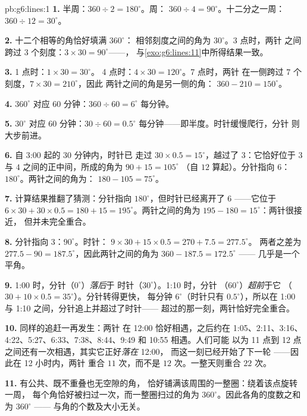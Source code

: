 \begin{solution}{pb:g6:lines:1}
\textbf{1.} 半周：$360 \div 2 = 180^\circ$。周：
$360 \div 4 = 90^\circ$。十二分之一周：$360 \div 12 = 30^\circ$。

\textbf{2.} 十二个相等的角恰好填满 $360^\circ$：
相邻刻度之间的角为 $30^\circ$。3 点时，两针
之间跨过 $3$ 个刻度：$3 \times 30 = 90^\circ$——，
与\cref{exo:g6:lines:11}中所得结果一致。

\textbf{3.} 1 点时：$1 \times 30 = 30^\circ$。
4 点时：$4 \times 30 = 120^\circ$。7 点时，两针
在一侧跨过 $7$ 个刻度，$7 \times 30 = 210^\circ$，因此
两针之间的角是另一侧的角：
$360 - 210 = 150^\circ$。

\textbf{4.} $360^\circ$ 对应 $60$ 分钟：$360 \div 60 =
6^\circ$ 每分钟。

\textbf{5.} $30^\circ$ 对应 $60$ 分钟：$30 \div 60 = 0.5^\circ$
每分钟——即半度。时针缓慢爬行，分针
则大步前进。

\textbf{6.} 自 3:00 起的 $30$ 分钟内，时针已
走过 $30 \times 0.5 = 15^\circ$，越过了 $3$：它恰好位于
$3$ 与 $4$ 之间的正中间，所成的角为 $90 + 15 = 105^\circ$
（自 $12$ 算起）。分针指向 $6$：
$180^\circ$。两针之间的角为：
$180 - 105 = 75^\circ$。

\textbf{7.} 计算结果推翻了猜测：分针指向
$180^\circ$，但时针已经离开了 $6$ ——它位于
$6 \times 30 + 30 \times 0.5 = 180 + 15 = 195^\circ$。两针之间的角为
$195 - 180 = 15^\circ$：两针很接近，
但并未完全重合。

\textbf{8.} 分针指向 $3$：$90^\circ$。时针：
$9 \times 30 + 15 \times 0.5 = 270 + 7.5 = 277.5^\circ$。
两者之差为 $277.5 - 90 = 187.5^\circ$，因此两针之间的角为
$360 - 187.5 = 172.5^\circ$ ——
几乎是一个平角。

\textbf{9.} 1:00 时，分针（$0^\circ$）\emph{落后}于
时针（$30^\circ$）。1:10 时，分针
（$60^\circ$）\emph{超前}于它
（$30 + 10 \times 0.5 = 35^\circ$）。分针转得更快，
每分钟 $6^\circ$（时针只有 $0.5^\circ$），所以在 1:00 与
1:10 之间，分针追上并超过了时针——
超过的那一刻，两针恰好完全重合。

\textbf{10.} 同样的追赶一再发生：两针
在 12:00 恰好相遇，之后约在 1:05、2:11、3:16、
4:22、5:27、6:33、7:38、8:44、9:49 和 10:55 相遇。人们可能
以为 11 点到 12 点之间还有一次相遇，其实它正好\emph{落在} 12:00，
而这一刻已经开始了下一轮 ——因此在 12 小时内，两针
重合 $11$ 次，而不是 $12$ 次。一整天则重合 $22$ 次。

\textbf{11.} 有公共、既不重叠也无空隙的角，
恰好铺满该周围的一整圈：绕着该点旋转一周，
每个角恰好被扫过一次，而一整圈扫过的角为
$360^\circ$。因此各角的度数之和为 $360^\circ$ ——
与角的个数及大小无关。


\end{solution}
